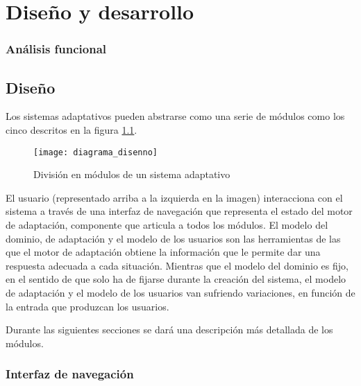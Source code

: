 \chapter{Diseño y desarrollo\label{sec:disenhoYDesarrollo}}




\subsection{Análisis funcional}


\section{Diseño}

Los sistemas adaptativos pueden abstrarse como una serie de módulos como los cinco descritos en la figura \ref{fig:diagrama_disenno}. 

\begin{figure}[htp!]
	\centering
	\texttt{[image: diagrama\_disenno]}
	\caption{División en módulos de un sistema adaptativo}
	\label{fig:diagrama_disenno}
\end{figure}

El usuario (representado arriba a la izquierda en la imagen) interacciona con el sistema a través de una interfaz de navegación que representa el estado del motor de adaptación, componente que articula a todos los módulos. El modelo del dominio, de adaptación y el modelo de los usuarios son las herramientas de las que el motor de adaptación obtiene la información que le permite dar una respuesta adecuada a cada situación. Mientras que el modelo del dominio es fijo, en el sentido de que solo ha de fijarse durante la creación del sistema, el modelo de adaptación y el modelo de los usuarios van sufriendo variaciones, en función de la entrada que produzcan los usuarios.

Durante las siguientes secciones se dará una descripción más detallada de los módulos.

\subsection{Interfaz de navegación}

